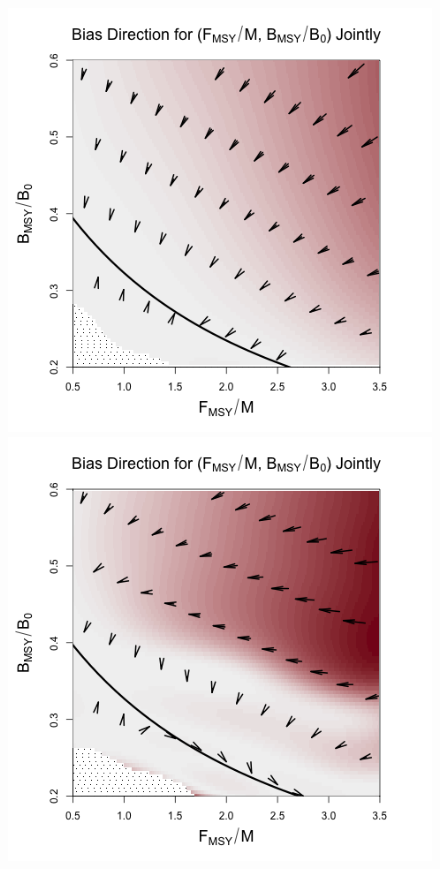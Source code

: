 %
\begin{figure}[h!]
\begin{minipage}[h!]{0.44\textwidth}
\includegraphics[width=\textwidth]{../ddBias/directionalBiasDDSubExpT45N150A0-1AS4K0.2N38.png}
\end{minipage}
\begin{minipage}[h!]{0.44\textwidth}
\includegraphics[width=\textwidth]{../ddBias/directionalBiasDDSubFlatT45N150A0-1AS1K0.5N56.png}

\end{minipage}
\end{figure}
